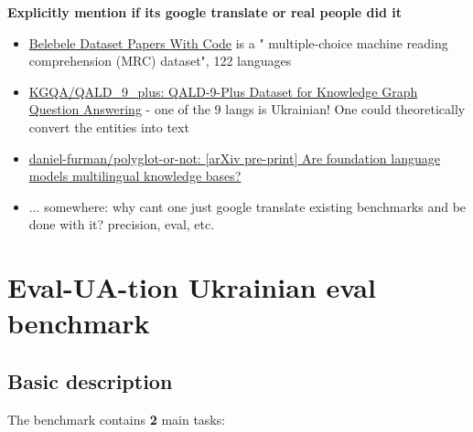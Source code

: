 \textbf{Explicitly mention if it\textquotesingle s google translate or
real people did it}

\begin{itemize}
\item
  \href{https://paperswithcode.com/dataset/belebele}{Belebele Dataset
  \textbar{} Papers With Code} is a " multiple-choice machine reading
  comprehension (MRC) dataset", 122 languages
\item
  \href{https://github.com/KGQA/QALD_9_plus}{KGQA/QALD\_9\_plus:
  QALD-9-Plus Dataset for Knowledge Graph Question Answering} - one of
  the 9 langs is Ukrainian! One could theoretically convert the entities
  into text
\item
  \href{https://github.com/daniel-furman/polyglot-or-not}{daniel-furman/polyglot-or-not:
  {[}arXiv pre-print{]} Are foundation language models multilingual
  knowledge bases?}
\item
  ... somewhere: why can\textquotesingle t one just google translate
  existing benchmarks and be done with it? precision, eval, etc.
\end{itemize}

\chapter{Eval-UA-tion Ukrainian eval
benchmark}\label{eval-ua-tion-ukrainian-eval-benchmark}

\section{Basic description}\label{basic-description}

The benchmark contains \textbf{2} main tasks:

